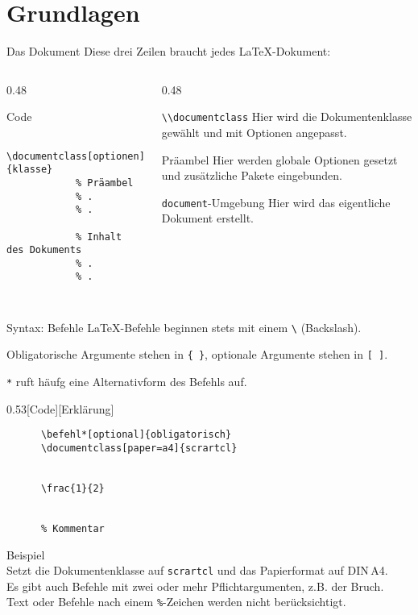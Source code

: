 \section{Grundlagen}

\begin{frame}[fragile]{Das Dokument}
  Diese drei Zeilen braucht jedes \LaTeX-Dokument:
  \begin{columns}[onlytextwidth, t]
    \begin{column}{0.48\textwidth}
      \begin{block}{Code}
        \begin{lstlisting}
          \documentclass[optionen]{klasse}
            % Präambel
            % .
            % .
          
            % Inhalt des Dokuments
            % .
            % .
          
        \end{lstlisting}
      \end{block}
    \end{column}
    \begin{column}{0.48\textwidth}
      \begin{block}{\lstinline+\\documentclass+}
        Hier wird die Dokumentenklasse gewählt und mit Optionen angepasst.
      \end{block}
      \begin{block}{Präambel}
        Hier werden globale Optionen gesetzt und zusätzliche Pakete eingebunden.
      \end{block}
      \begin{block}{\texttt{document}-Umgebung}
        Hier wird das eigentliche Dokument erstellt.
      \end{block}
    \end{column}
  \end{columns}
\end{frame}

\begin{frame}[fragile]{Syntax: Befehle}
  \LaTeX-Befehle beginnen stets mit einem \verb+\+ (Backslash).

  Obligatorische Argumente stehen in \lstinline+{ }+, optionale Argumente stehen in \lstinline+[ ]+.

  \verb+*+ ruft häufg eine Alternativform des Befehls auf.
  \begin{CodeExample}{0.53}[Code][Erklärung]
    \begin{lstlisting}
      \befehl*[optional]{obligatorisch}
      \documentclass[paper=a4]{scrartcl}


      \frac{1}{2}


      % Kommentar
    \end{lstlisting}
  \CodeResult
    Beispiel \\
    Setzt die Dokumentenklasse auf \texttt{scrartcl} und das Papierformat auf DIN\,A4. \\
    Es gibt auch Befehle mit zwei oder mehr Pflichtargumenten, z.B. der Bruch. \\
    Text oder Befehle nach einem \verb+%+-Zeichen werden nicht berücksichtigt.
  \end{CodeExample}
\end{frame}

